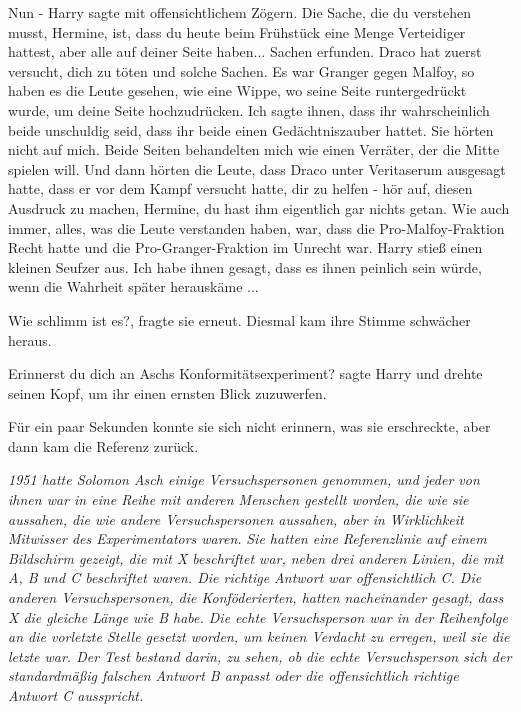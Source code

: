 \glqq{}Nun -\grqq{} Harry sagte mit offensichtlichem Zögern. \glqq{}Die Sache, die
du verstehen musst, Hermine, ist, dass du heute beim Frühstück eine Menge
Verteidiger hattest, aber alle auf deiner Seite haben... Sachen erfunden. Draco
hat zuerst versucht, dich zu töten und solche Sachen. Es war Granger gegen
Malfoy, so haben es die Leute gesehen, wie eine Wippe, wo seine Seite
runtergedrückt wurde, um deine Seite hochzudrücken. Ich sagte ihnen, dass ihr
wahrscheinlich beide unschuldig seid, dass ihr beide einen Gedächtniszauber
hattet. Sie hörten nicht auf mich. Beide Seiten behandelten mich wie einen
Verräter, der die Mitte spielen will. Und dann hörten die Leute, dass Draco
unter Veritaserum ausgesagt hatte, dass er vor dem Kampf versucht hatte, dir zu
helfen - hör auf, diesen Ausdruck zu machen, Hermine, du hast ihm eigentlich gar
nichts getan. Wie auch immer, alles, was die Leute verstanden haben, war, dass
die Pro-Malfoy-Fraktion Recht hatte und die Pro-Granger-Fraktion im Unrecht
war.\grqq{} Harry stieß einen kleinen Seufzer aus. \glqq{}Ich habe ihnen gesagt,
dass es ihnen peinlich sein würde, wenn die Wahrheit später herauskäme
...\grqq{}

\glqq{}Wie schlimm ist es?\grqq{}, fragte sie erneut. Diesmal kam ihre Stimme
schwächer heraus.

\glqq{}Erinnerst du dich an Aschs Konformitätsexperiment?\grqq{} sagte Harry und
drehte seinen Kopf, um ihr einen ernsten Blick zuzuwerfen.

Für ein paar Sekunden konnte sie sich nicht erinnern, was sie erschreckte, aber
dann kam die Referenz zurück.

\emph{1951 hatte Solomon Asch einige Versuchspersonen genommen, und jeder von
ihnen war in eine Reihe mit anderen Menschen gestellt worden, die wie sie
aussahen, die wie andere Versuchspersonen aussahen, aber in Wirklichkeit
Mitwisser des Experimentators waren.} \emph{Sie hatten eine Referenzlinie auf
einem Bildschirm gezeigt, die mit X beschriftet war, neben drei anderen Linien,
die mit A, B und C beschriftet waren. Die richtige Antwort war offensichtlich C.
Die anderen \glqq{}Versuchspersonen\grqq{}, die Konföderierten, hatten
nacheinander gesagt, dass X die gleiche Länge wie B habe. Die echte
Versuchsperson war in der Reihenfolge an die vorletzte Stelle gesetzt worden, um
keinen Verdacht zu erregen, weil sie die letzte war. Der Test bestand darin, zu
sehen, ob die echte Versuchsperson sich der standardmäßig falschen Antwort B
\glqq{}anpasst\grqq{} oder die offensichtlich richtige Antwort C ausspricht.}

